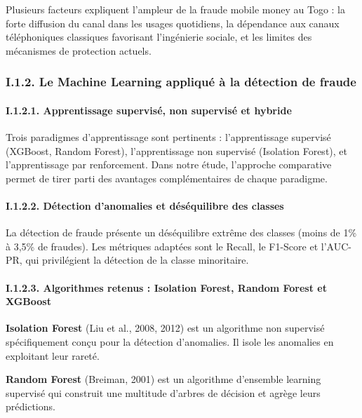 \documentclass[
  12pt,
]{article}
\begin{document}
Plusieurs facteurs expliquent l’ampleur de la fraude mobile money au
Togo : la forte diffusion du canal dans les usages quotidiens, la
dépendance aux canaux téléphoniques classiques favorisant l’ingénierie
sociale, et les limites des mécanismes de protection actuels.

\subsubsection{I.1.2. Le Machine Learning appliqué à la détection de
fraude}\label{i.1.2.-le-machine-learning-appliquuxe9-uxe0-la-duxe9tection-de-fraude}

\paragraph{I.1.2.1. Apprentissage supervisé, non supervisé et
hybride}\label{i.1.2.1.-apprentissage-supervisuxe9-non-supervisuxe9-et-hybride}

Trois paradigmes d’apprentissage sont pertinents : l’apprentissage
supervisé (XGBoost, Random Forest), l’apprentissage non supervisé
(Isolation Forest), et l’apprentissage par renforcement. Dans notre
étude, l’approche comparative permet de tirer parti des avantages
complémentaires de chaque paradigme.

\paragraph{I.1.2.2. Détection d’anomalies et déséquilibre des
classes}\label{i.1.2.2.-duxe9tection-danomalies-et-duxe9suxe9quilibre-des-classes}

La détection de fraude présente un déséquilibre extrême des classes
(moins de 1\% à 3,5\% de fraudes). Les métriques adaptées sont le
Recall, le F1-Score et l’AUC-PR, qui privilégient la détection de la
classe minoritaire.

\paragraph{I.1.2.3. Algorithmes retenus : Isolation Forest, Random
Forest et
XGBoost}\label{i.1.2.3.-algorithmes-retenus-isolation-forest-random-forest-et-xgboost}

\textbf{Isolation Forest} (Liu et al., 2008, 2012) est un algorithme non
supervisé spécifiquement conçu pour la détection d’anomalies. Il isole
les anomalies en exploitant leur rareté.

\textbf{Random Forest} (Breiman, 2001) est un algorithme d’ensemble
learning supervisé qui construit une multitude d’arbres de décision et
agrège leurs prédictions.
\end{document}
